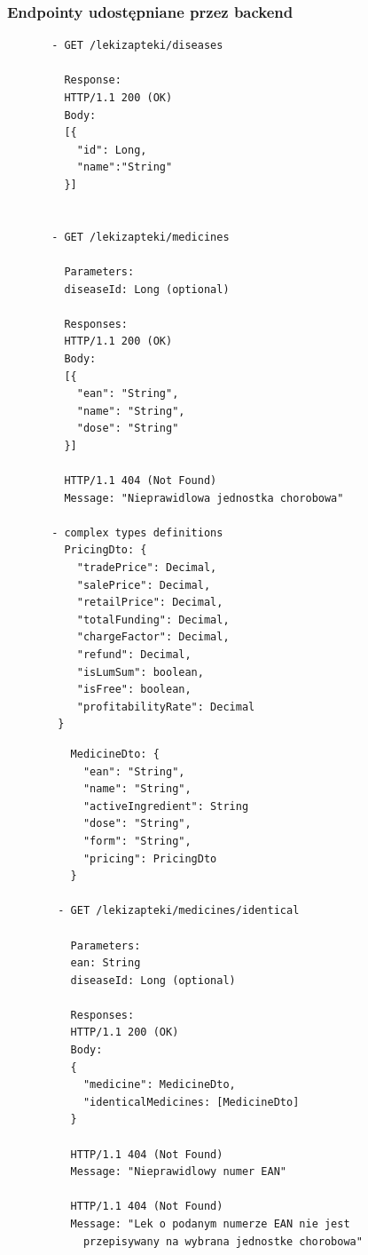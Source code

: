 \documentclass{article}
\begin{document}
    \subsubsection{Endpointy udostępniane przez backend}
    \noindent
    \begin{minipage}{.45\textwidth}
     \begin{lstlisting}
       - GET /lekizapteki/diseases

         Response:
         HTTP/1.1 200 (OK)
         Body:
         [{
           "id": Long,
           "name":"String"
         }]


       - GET /lekizapteki/medicines

         Parameters:
         diseaseId: Long (optional)

         Responses:
         HTTP/1.1 200 (OK)
         Body:
         [{
           "ean": "String",
           "name": "String",
           "dose": "String"
         }]

         HTTP/1.1 404 (Not Found)
         Message: "Nieprawidlowa jednostka chorobowa"

       - complex types definitions
         PricingDto: {
           "tradePrice": Decimal,
           "salePrice": Decimal,
           "retailPrice": Decimal,
           "totalFunding": Decimal,
           "chargeFactor": Decimal,
           "refund": Decimal,
           "isLumSum": boolean,
           "isFree": boolean,
           "profitabilityRate": Decimal
        }

     \end{lstlisting}
    \end{minipage}\hfill
    \begin{minipage}{.45\textwidth}
      \begin{lstlisting}
          MedicineDto: {
            "ean": "String",
            "name": "String",
            "activeIngredient": String
            "dose": "String",
            "form": "String",
            "pricing": PricingDto
          }

        - GET /lekizapteki/medicines/identical

          Parameters:
          ean: String
          diseaseId: Long (optional)

          Responses:
          HTTP/1.1 200 (OK)
          Body:
          {
            "medicine": MedicineDto,
            "identicalMedicines: [MedicineDto]
          }

          HTTP/1.1 404 (Not Found)
          Message: "Nieprawidlowy numer EAN"

          HTTP/1.1 404 (Not Found)
          Message: "Lek o podanym numerze EAN nie jest
            przepisywany na wybrana jednostke chorobowa"
      \end{lstlisting}
    \end{minipage}
\end{document}
